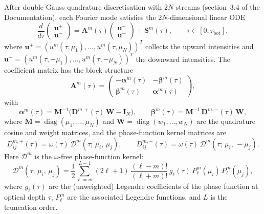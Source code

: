 \documentclass[11pt,a4paper]{article}
\newcommand{\diag}{\operatorname{diag}}
\newcommand{\vect}[1]{\bm{#1}}
\newcommand{\mat}[1]{\mathbf{#1}}
\newcommand{\tbot}{\tau_{\mathrm{bot}}}
\theoremstyle{definition}
\begin{document}
After double-Gauss quadrature discretisation with $2N$ streams
(section~3.4 of the Documentation), each Fourier mode satisfies the
$2N$-dimensional linear ODE
\begin{equation}\label{eq:ode}
  \frac{d}{d\tau}\begin{pmatrix}\vect{u}^+\\\vect{u}^-\end{pmatrix}
  = \mat{A}^m(\tau)
    \begin{pmatrix}\vect{u}^+\\\vect{u}^-\end{pmatrix}
  + \vect{S}^m(\tau),
  \qquad \tau\in[0,\tbot],
\end{equation}
where $\vect{u}^+ = (u^m(\tau,\mu_1),\dots,u^m(\tau,\mu_N))^T$ collects the
upward intensities and $\vect{u}^- = (u^m(\tau,-\mu_1),\dots,u^m(\tau,-\mu_N))^T$
the downward intensities.  The coefficient matrix has the block structure
\begin{equation}\label{eq:A_block}
  \mat{A}^m(\tau) = \begin{pmatrix}
    -\mat{\alpha}^m(\tau) & -\mat{\beta}^m(\tau) \\
     \mat{\beta}^m(\tau)  &  \mat{\alpha}^m(\tau)
  \end{pmatrix},
\end{equation}
with
\begin{equation}\label{eq:alpha_beta}
  \mat{\alpha}^m(\tau)
  = \mat{M}^{-1}\bigl(\mat{D}^{m,+}(\tau)\,\mat{W} - \mat{I}_N\bigr),
  \qquad
  \mat{\beta}^m(\tau)
  = \mat{M}^{-1}\,\mat{D}^{m,-}(\tau)\,\mat{W},
\end{equation}
where $\mat{M}=\diag(\mu_1,\dots,\mu_N)$ and
$\mat{W}=\diag(w_1,\dots,w_N)$ are the quadrature cosine and weight
matrices, and the phase-function kernel matrices are
\begin{equation}\label{eq:D_pm}
  D^{m,+}_{ij}(\tau) = \omega(\tau)\,\mathcal{D}^m(\tau;\,\mu_i,\,\mu_j),
  \qquad
  D^{m,-}_{ij}(\tau) = \omega(\tau)\,\mathcal{D}^m(\tau;\,\mu_i,\,-\mu_j).
\end{equation}
Here $\mathcal{D}^m$ is the $\omega$-free phase-function kernel:
\begin{equation}\label{eq:D_pure}
  \mathcal{D}^m(\tau;\,\mu_i,\,\mu_j)
  = \frac{1}{2}\sum_{\ell=m}^{L-1}(2\ell+1)\,
    \frac{(\ell-m)!}{(\ell+m)!}\,
    g_\ell(\tau)\,P_\ell^m(\mu_i)\,P_\ell^m(\mu_j),
\end{equation}
where $g_\ell(\tau)$ are the (unweighted) Legendre coefficients of the
phase function at optical depth $\tau$, $P_\ell^m$ are the associated
Legendre functions, and $L$ is the truncation order.
\end{document}
